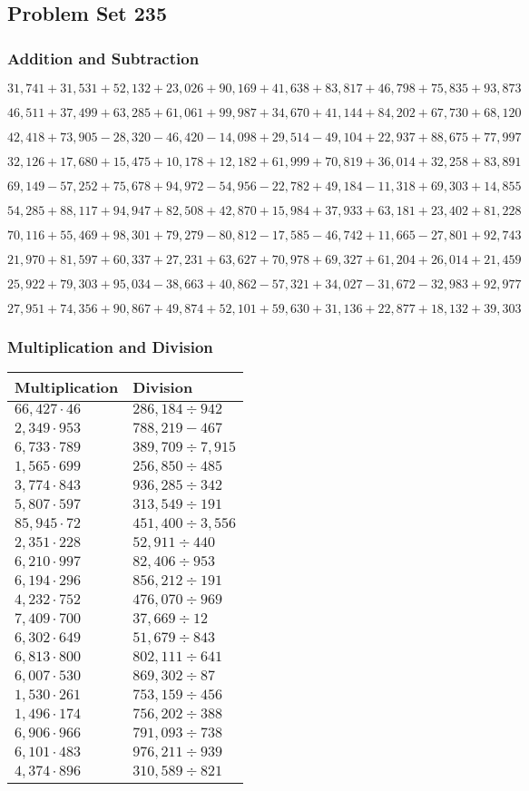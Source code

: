 \hypertarget{problem-set-235}{%
\subsection{Problem Set 235}\label{problem-set-235}}

\hypertarget{addition-and-subtraction}{%
\subsubsection{Addition and
Subtraction}\label{addition-and-subtraction}}

\(31,741+31,531+52,132+23,026+90,169+41,638+83,817+46,798+75,835+93,873\)

\(46,511+37,499+63,285+61,061+99,987+34,670+41,144+84,202+67,730+68,120\)

\(42,418+73,905-28,320-46,420-14,098+29,514-49,104+22,937+88,675+77,997\)

\(32,126+17,680+15,475+10,178+12,182+61,999+70,819+36,014+32,258+83,891\)

\(69,149-57,252+75,678+94,972-54,956-22,782+49,184-11,318+69,303+14,855\)

\(54,285+88,117+94,947+82,508+42,870+15,984+37,933+63,181+23,402+81,228\)

\(70,116+55,469+98,301+79,279-80,812-17,585-46,742+11,665-27,801+92,743\)

\(21,970+81,597+60,337+27,231+63,627+70,978+69,327+61,204+26,014+21,459\)

\(25,922+79,303+95,034-38,663+40,862-57,321+34,027-31,672-32,983+92,977\)

\(27,951+74,356+90,867+49,874+52,101+59,630+31,136+22,877+18,132+39,303\)

\hypertarget{multiplication-and-division}{%
\subsubsection{Multiplication and
Division}\label{multiplication-and-division}}

\begin{longtable}[]{@{}ll@{}}
\toprule
Multiplication & Division\tabularnewline
\midrule
\endhead
\(66,427\cdot46\) & \(286,184÷942\)\tabularnewline
\(2,349\cdot953\) & \(788,219- 467\)\tabularnewline
\(6,733\cdot789\) & \(389,709÷7,915\)\tabularnewline
\(1,565\cdot699\) & \(256,850÷485\)\tabularnewline
\(3,774\cdot843\) & \(936,285÷342\)\tabularnewline
\(5,807\cdot597\) & \(313,549÷191\)\tabularnewline
\(85,945\cdot72\) & \(451,400÷3,556\)\tabularnewline
\(2,351\cdot228\) & \(52,911÷440\)\tabularnewline
\(6,210\cdot997\) & \(82,406÷953\)\tabularnewline
\(6,194\cdot296\) & \(856,212÷191\)\tabularnewline
\(4,232\cdot752\) & \(476,070÷969\)\tabularnewline
\(7,409\cdot700\) & \(37,669÷12\)\tabularnewline
\(6,302\cdot649\) & \(51,679÷843\)\tabularnewline
\(6,813\cdot800\) & \(802,111÷641\)\tabularnewline
\(6,007\cdot530\) & \(869,302÷87\)\tabularnewline
\(1,530\cdot261\) & \(753,159÷456\)\tabularnewline
\(1,496\cdot174\) & \(756,202÷388\)\tabularnewline
\(6,906\cdot966\) & \(791,093÷738\)\tabularnewline
\(6,101\cdot483\) & \(976,211÷939\)\tabularnewline
\(4,374\cdot896\) & \(310,589÷821\)\tabularnewline
\bottomrule
\end{longtable}
